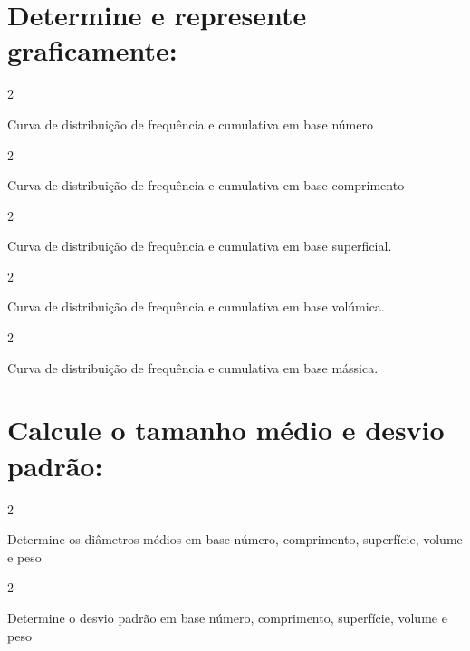 \documentclass[\mainfilename]{subfiles}
\begin{document}
\begin{questionBox}
\begin{table}[H]
\begin{tabular}{c l r r}
            \\\bottomrule
            
        \end{tabular}
    \end{table}

\end{questionBox}

\section*{Determine e represente graficamente:}

\begin{questionBox}2{} %
    
    Curva de distribuição de frequência e cumulativa em base número
    
\end{questionBox}

\begin{questionBox}2{} %
    
    Curva de distribuição de frequência e cumulativa em base comprimento 
    
\end{questionBox}

\begin{questionBox}2{} %
    
    Curva de distribuição de frequência e cumulativa em base superficial.
    
\end{questionBox}

\begin{questionBox}2{} %
    
    Curva de distribuição de frequência e cumulativa em base volúmica.
    
\end{questionBox}

\begin{questionBox}2{} %
    
    Curva de distribuição de frequência e cumulativa em base mássica.
    
\end{questionBox}

\section*{Calcule o tamanho médio e desvio padrão:}

\begin{questionBox}2{} %
    
    Determine os diâmetros médios em base número, comprimento, superfície, volume e peso
    
\end{questionBox}

\begin{questionBox}2{} %
    
    Determine o desvio padrão em base número, comprimento, superfície, volume e peso
    
\end{questionBox}
\end{document}
